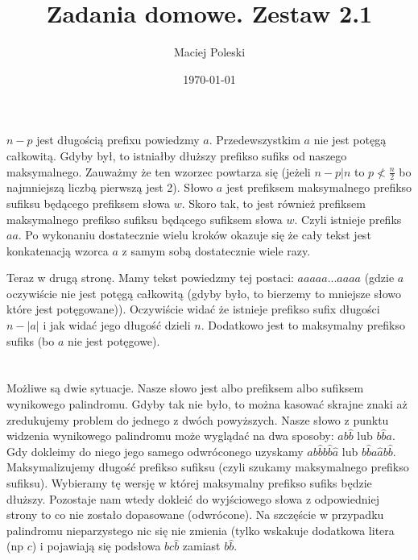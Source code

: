 \documentclass[a4paper,12pt]{article}
\title{Zadania domowe. Zestaw 2.1}
\author{Maciej Poleski}
\date{\today}
\begin{document}
\maketitle

\newpage

\section{}
$n-p$ jest długością prefixu powiedzmy $a$. Przedewszystkim $a$ nie jest potęgą całkowitą. Gdyby był, to istniałby dłuższy prefikso sufiks od naszego maksymalnego. Zauważmy że ten wzorzec powtarza się (jeżeli $n-p|n$ to $p\nless{\frac{n}{2}}$ bo najmniejszą liczbą pierwszą jest 2). Słowo $a$ jest prefiksem maksymalnego prefikso sufiksu będącego prefiksem słowa $w$. Skoro tak, to jest również prefiksem maksymalnego prefikso sufiksu będącego sufiksem słowa $w$. Czyli istnieje prefiks $aa$. Po wykonaniu dostatecznie wielu kroków okazuje się że cały tekst jest konkatenacją wzorca $a$ z samym sobą dostatecznie wiele razy.

Teraz w drugą stronę. Mamy tekst powiedzmy tej postaci: $aaaaa...aaaa$ (gdzie $a$ oczywiście nie jest potęgą całkowitą (gdyby było, to bierzemy to mniejsze słowo które jest potęgowane)). Oczywiście widać że istnieje prefikso sufix długości $n-|a|$ i jak widać jego długość dzieli $n$. Dodatkowo jest to maksymalny prefikso sufiks (bo $a$ nie jest potęgowe).

\section{}
Możliwe są dwie sytuacje. Nasze słowo jest albo prefiksem albo sufiksem wynikowego palindromu. Gdyby tak nie było, to można kasować skrajne znaki aż zredukujemy problem do jednego z dwóch powyższych.
Nasze słowo z punktu widzenia wynikowego palindromu może wyglądać na dwa sposoby: $ab\hat{b}$ lub $b\hat{b}a$. Gdy dokleimy do niego jego samego odwróconego uzyskamy $ab\hat{b}b\hat{b}\hat{a}$ lub $b\hat{b}a\hat{a}b\hat{b}$. Maksymalizujemy długość prefikso sufiksu (czyli szukamy maksymalnego prefikso sufiksu). Wybieramy tę wersję w której maksymalny prefikso sufiks będzie dłuższy. Pozostaje nam wtedy dokleić do wyjściowego słowa z odpowiedniej strony to co nie zostało dopasowane (odwrócone). Na szczęście w przypadku palindromu nieparzystego nic się nie zmienia (tylko wskakuje dodatkowa litera (np $c$) i pojawiają się podsłowa $bc\hat{b}$ zamiast $b\hat{b}$.

\section{}
\end{document}
